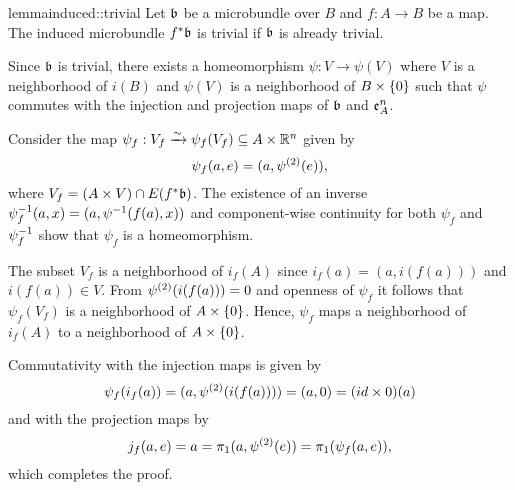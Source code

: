 \begin{mystatement}{lemma}{induced::trivial}
    Let $\bb$ be a microbundle over $B$ and $f: A \to B$ be a map.
    The induced microbundle $\ind{f}\bb$ is trivial if $\bb$ is already trivial.
\end{mystatement}

\begin{myproof}
    Since $\bb$ is trivial, there exists a homeomorphism $\psi: V \to \psi(V)$
    where $V$ is a neighborhood of $i(B)$ and $\psi(V)$ is a neighborhood of $B \times \{0\}$
    such that $\psi$ commutes with the injection and projection maps of $\bb$ and $\mathfrak{e}^{n}_{A}$.
    
    Consider the map $\psi_f: V_f \xrightarrow{\sim} \psi_f(V_f) \subseteq{} A \times \mathbb{R}^n$ given by
    \[ \psi_f(a, e) = (a, \psi^{(2)}(e)), \]
    where $V_f = (A \cross V) \cap E(\ind{f}\bb)$.
    The existence of an inverse $\psi_f^{-1}(a, x) = (a, \psi^{-1}(f(a), x))$
    and component-wise continuity for both $\psi_f$ and $\psi_f^{-1}$
    show that $\psi_f$ is a homeomorphism.
    
    The subset $V_f$ is a neighborhood of $i_f(A)$ since
    $i_f(a) = (a, i(f(a)))$ and $i(f(a)) \in V$.
    From $\psi^{(2)}(i(f(a))) = 0$ and openness of $\psi_f$
    it follows that $\psi_f(V_f)$ is a neighborhood of $A \times{} \{0\}$.
    Hence, $\psi_f$ maps a neighborhood of $i_f(A)$
    to a neighborhood of $A \times{} \{0\}$.

    Commutativity with the injection maps is given by
    \[ \psi_f(i_f(a)) = (a, \psi^{(2)}(i(f(a)))) = (a, 0) = (id \times 0)(a) \]
    and with the projection maps by
    \[ j_f(a, e) = a = \pi_1(a, \psi^{(2)}(e)) = \pi_1(\psi_f(a, e)), \]
    which completes the proof.
\end{myproof}